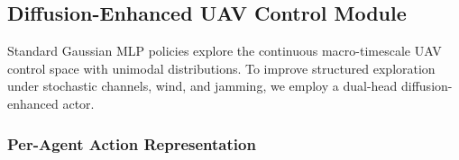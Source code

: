\documentclass[journal]{IEEEtran}
\begin{document}




\subsection{Diffusion-Enhanced UAV Control Module}

Standard Gaussian MLP policies explore the continuous macro-timescale 
UAV control space with unimodal distributions. To improve structured 
exploration under stochastic channels, wind, and jamming, we employ a 
dual-head diffusion-enhanced actor.

\subsubsection{Per-Agent Action Representation}
\end{document}
